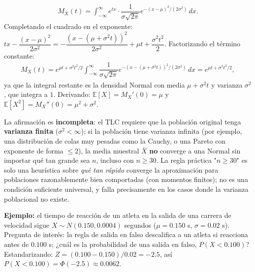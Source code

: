 \begin{solproblema}[prob:dd1e027]
	\begin{align*}
		M_X(t) = \int_{-\infty}^{\infty} e^{tx}\cdot\dfrac{1}{\sigma\sqrt{2\pi}}e^{-(x-\mu)^2/(2\sigma^2)}\,dx.
	\end{align*}
	Completando el cuadrado en el exponente: $tx - \dfrac{(x-\mu)^2}{2\sigma^2} = -\dfrac{(x-(\mu+\sigma^2t))^2}{2\sigma^2} + \mu t + \dfrac{\sigma^2t^2}{2}$. Factorizando el término constante:
	\begin{align*}
		M_X(t) = e^{\mu t+\sigma^2t^2/2}\int_{-\infty}^{\infty}\dfrac{1}{\sigma\sqrt{2\pi}}e^{-(x-(\mu+\sigma^2t))^2/(2\sigma^2)}\,dx = e^{\mu t+\sigma^2t^2/2},
	\end{align*}
	ya que la integral restante es la densidad Normal con media $\mu+\sigma^2t$ y varianza $\sigma^2$, que integra a $1$. Derivando: $\mathbb{E}[X]=M_X'(0)=\mu$ y $\mathbb{E}[X^2]=M_X''(0)=\mu^2+\sigma^2$.
\end{solproblema}

\begin{solproblema}[prob:96d8f57]
	La afirmación es \textbf{incompleta}: el TLC requiere que la población original tenga \textbf{varianza finita} ($\sigma^2<\infty$); si la población tiene varianza infinita (por ejemplo, una distribución de colas muy pesadas como la Cauchy, o una Pareto con exponente de forma $\le 2$), la media muestral $\bar{X}$ \textbf{no} converge a una Normal sin importar qué tan grande sea $n$, incluso con $n\ge30$. La regla práctica "$n\ge30$" es solo una heurística sobre \emph{qué tan rápido} converge la aproximación para poblaciones razonablemente bien comportadas (con momentos finitos); no es una condición suficiente universal, y falla precisamente en los casos donde la varianza poblacional no existe.
\end{solproblema}

\begin{solproblema}
	\textbf{Ejemplo:} el tiempo de reacción de un atleta en la salida de una carrera de velocidad sigue $X\sim N(0.150, 0.0004)$ segundos ($\mu=0.150$ s, $\sigma=0.02$ s). Pregunta de interés: la regla de salida en falso descalifica a un atleta si reacciona antes de $0.100$ s; ¿cuál es la probabilidad de una salida en falso, $P(X<0.100)$? Estandarizando: $Z = (0.100-0.150)/0.02 = -2.5$, así $P(X<0.100) = \Phi(-2.5) \approx 0.0062$.
\end{solproblema}
